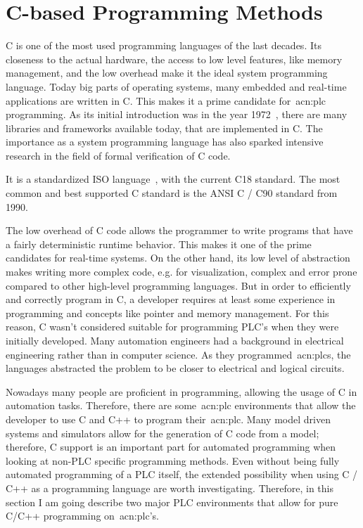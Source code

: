 \section{C-based Programming Methods}
\label{sec:c_methods}

C is one of the most used programming languages of the last decades.
Its closeness to the actual hardware, the access to low level features, like memory management, and the low overhead make it the ideal system programming language.
Today big parts of operating systems, many embedded and real-time applications are written in C.
This makes it a prime candidate for~\acrshort{acn:plc} programming.
As its initial introduction was in the year 1972~\cite{10.5555/576122}, there are many libraries and frameworks available today, that are implemented in C.
The importance as a system programming language has also sparked intensive research in the field of formal verification of C code.

It is a standardized ISO language~\cite{ISO:9899:2018}, with the current C18 standard.
The most common and best supported C standard is the ANSI C / C90 standard from 1990.

The low overhead of C code allows the programmer to write programs that have a fairly deterministic runtime behavior.
This makes it one of the prime candidates for real-time systems.
On the other hand, its low level of abstraction makes writing more complex code, e.g. for visualization, complex and error prone compared to other high-level programming languages.
But in order to efficiently and correctly program in C, a developer requires at least some experience in programming and concepts like pointer and memory management.
For this reason, C wasn't considered suitable for programming PLC's when they were initially developed.
Many automation engineers had a background in electrical engineering rather than in computer science.
As they programmed~\acrshort{acn:plc}s, the languages abstracted the problem to be closer to electrical and logical circuits.

Nowadays many people are proficient in programming, allowing the usage of C in automation tasks.
Therefore, there are some~\acrshort{acn:plc} environments that allow the developer to use C and C++ to program their~\acrshort{acn:plc}.
Many model driven systems and simulators allow for the generation of C code from a model; therefore, C support is an important part for automated programming when looking at non-PLC specific programming methods.
Even without being fully automated programming of a PLC itself, the extended possibility when using C / C++ as a programming language are worth investigating.
Therefore, in this section I am going describe two major PLC environments that allow for pure C/C++ programming on~\acrshort{acn:plc}'s.

